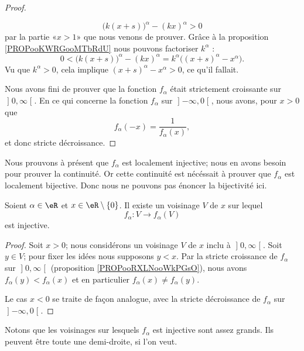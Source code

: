 \begin{proof}
\begin{subproof}
            \begin{equation}
                \big( k(x+s) \big)^{\alpha}-(kx)^{\alpha}>0
            \end{equation}
            par la partie «\( x>1\)» que nous venons de prouver. Grâce à la proposition \ref{PROPooKWRGooMTbRdU} nous pouvons factoriser \( k^{\alpha}\) :
            \begin{equation}
                0<\big( k(x+s) \big)^{\alpha}-(kx)^{\alpha}=k^{\alpha}\big( (x+s)^{\alpha}-x^{\alpha} \big).
            \end{equation}
            Vu que \( k^{\alpha}>0\), cela implique \( (x+s)^{\alpha}-x^{\alpha}>0\), ce qu'il fallait.
    \end{subproof}
Nous avons fini de prouver que la fonction \( f_{\alpha}\) était strictement croissante sur \( \mathopen] 0 , \infty \mathclose[\). En ce qui concerne la fonction \( f_{\alpha}\) sur \( \mathopen] -\infty , 0 \mathclose[\), nous avons, pour \( x>0\) que
    \begin{equation}
        f_{\alpha}(-x)=\frac{1}{ f_{\alpha}(x) },
    \end{equation}
    et donc stricte décroissance.
\end{proof}

Nous prouvons à présent que \( f_{\alpha}\) est localement injective; nous en avons besoin pour prouver la continuité. Or cette continuité est nécéssait à prouver que \( f_{\alpha}\) est localement bijective. Donc nous ne pouvons pas énoncer la bijectivité ici.
\begin{proposition}     \label{PROPooHKTKooCUEBjh}
    Soient \( \alpha\in \eR\) et \( x\in \eR\setminus\{ 0 \}\). Il existe un voisinage \( V\) de \( x\) sur lequel
    \begin{equation}
            f_{\alpha}\colon V \to f_{\alpha}(V) 
    \end{equation}
    est injective.
\end{proposition}

\begin{proof}
Soit \( x>0 \); nous considérons un voisinage \( V\) de \( x\) inclu à \( \mathopen] 0 , \infty \mathclose[\). Soit \( y\in V\); pour fixer les idées nous supposons \( y<x\). Par la stricte croissance de \( f_{\alpha}\) sur \( \mathopen] 0 , \infty \mathclose[\) (proposition \ref{PROPooRXLNooWkPGsO}), nous avons \( f_{\alpha}(y)<f_{\alpha}(x)\) et en particulier \( f_{\alpha}(x)\neq f_{\alpha}(y)\).

Le cas \( x<0\) se traite de façon analogue, avec la stricte décroissance de \( f_{\alpha}\) sur \( \mathopen] -\infty , 0 \mathclose[\).
\end{proof}
Notons que les voisinages sur lesquels \( f_{\alpha}\) est injective sont assez grands. Ils peuvent être toute une demi-droite, si l'on veut.

